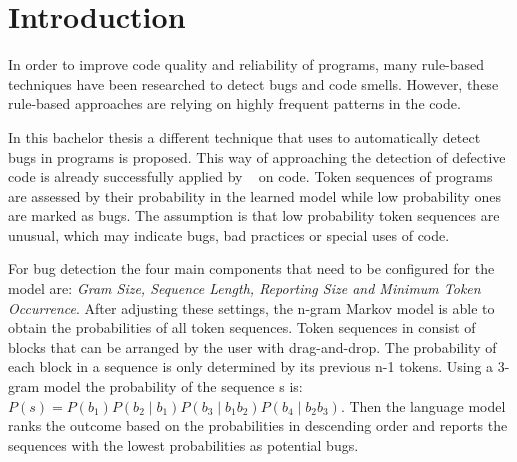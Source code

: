 \chapter{Introduction}\label{chap:introduction}

In order to improve code quality and reliability of programs, many rule-based techniques have been researched to detect bugs and code smells. However, these rule-based approaches are relying on highly frequent patterns in the code. 

In this bachelor thesis a different technique that uses  to automatically detect bugs in \scratch{} programs is proposed. This way of approaching the detection of defective code is already successfully applied by \bugram{}~\cite{bugram} on \java{} code. Token sequences of programs are assessed by their probability in the learned model while low probability ones are marked as bugs. The assumption is that low probability token sequences are unusual, which may indicate bugs, bad practices or special uses of code. 

For bug detection the four main components that need to be configured for the model are: \textit{Gram Size, Sequence Length, Reporting Size and Minimum Token Occurrence}. After adjusting these settings, the n-gram Markov model is able to obtain the probabilities of all token sequences. Token sequences in \scratch{} consist of blocks that can be arranged by the user with drag-and-drop. The probability of each block in a sequence is only determined by its previous n-1 tokens. Using a 3-gram model the probability of the sequence s is:
\(P(s) = P(b_{1})P(b_{2}\mid b_{1})P(b_{3}\mid b_{1}b_{2})P(b_{4}\mid b_{2}b_{3}) \). Then the language model ranks the outcome based on the probabilities in descending order and reports the sequences with the lowest probabilities as potential bugs. 